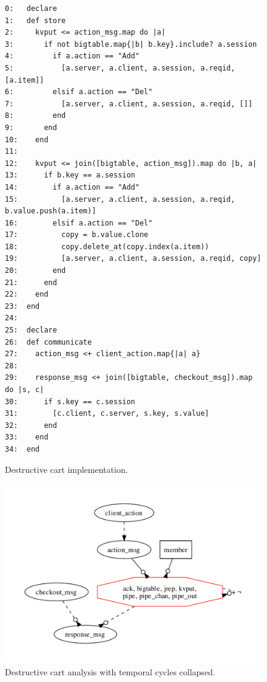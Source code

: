\begin{figure}[t]
\begin{scriptsize}
\begin{verbatim}
0:   declare
1:   def store
2:     kvput <= action_msg.map do |a|
3:       if not bigtable.map{|b| b.key}.include? a.session
4:         if a.action == "Add"
5:           [a.server, a.client, a.session, a.reqid, [a.item]]
6:         elsif a.action == "Del"
7:           [a.server, a.client, a.session, a.reqid, []]
8:         end
9:       end
10:    end  
11:
12:    kvput <= join([bigtable, action_msg]).map do |b, a|
13:      if b.key == a.session
14:        if a.action == "Add"
15:          [a.server, a.client, a.session, a.reqid, b.value.push(a.item)]
16:        elsif a.action == "Del"
17:          copy = b.value.clone
18:          copy.delete_at(copy.index(a.item))
19:          [a.server, a.client, a.session, a.reqid, copy]
20:        end
21:      end
22:    end
23:  end
24:
25:  declare
26:  def communicate
27:    action_msg <+ client_action.map{|a| a}
28:
29:    response_msg <+ join([bigtable, checkout_msg]).map do |s, c|
30:      if s.key == c.session
31:        [c.client, c.server, s.key, s.value]
32:      end
33:    end
34:  end
\end{verbatim}
\vspace{-10pt}
\caption{Destructive cart implementation.}
\label{fig:pdg-destructive}
\vspace{-2pt}
\end{scriptsize}
\end{figure}

\begin{figure}[t]
\centering
\includegraphics[width=0.9\linewidth]{fig/destructive.pdf}
\vspace{-10pt}
\caption{Destructive cart analysis with temporal cycles collapsed.}
\label{fig:pdg-destructive-analysis}
\vspace{-2pt}
\end{figure}


